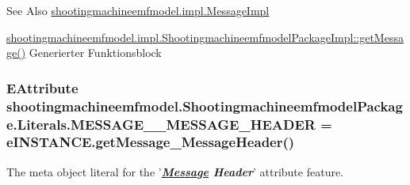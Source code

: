 \begin{DoxySeeAlso}{See Also}
\hyperlink{classshootingmachineemfmodel_1_1impl_1_1_message_impl}{shootingmachineemfmodel.\-impl.\-Message\-Impl} 

\hyperlink{classshootingmachineemfmodel_1_1impl_1_1_shootingmachineemfmodel_package_impl_ac5110626e0726dd7b9161fc57637d468}{shootingmachineemfmodel.\-impl.\-Shootingmachineemfmodel\-Package\-Impl\-::get\-Message()} Generierter Funktionsblock 
\end{DoxySeeAlso}
\hypertarget{interfaceshootingmachineemfmodel_1_1_shootingmachineemfmodel_package_1_1_literals_ac9c85c0837360031ccab61c9f987e8c9}{
\subsubsection[{M\-E\-S\-S\-A\-G\-E\-\_\-\-\_\-\-M\-E\-S\-S\-A\-G\-E\-\_\-\-H\-E\-A\-D\-E\-R}]{\setlength{\rightskip}{0pt plus 5cm}E\-Attribute shootingmachineemfmodel.\-Shootingmachineemfmodel\-Package.\-Literals.\-M\-E\-S\-S\-A\-G\-E\-\_\-\-\_\-\-M\-E\-S\-S\-A\-G\-E\-\_\-\-H\-E\-A\-D\-E\-R = e\-I\-N\-S\-T\-A\-N\-C\-E.\-get\-Message\-\_\-\-Message\-Header()}}\label{interfaceshootingmachineemfmodel_1_1_shootingmachineemfmodel_package_1_1_literals_ac9c85c0837360031ccab61c9f987e8c9}
The meta object literal for the '{\itshape {\bfseries \hyperlink{interfaceshootingmachineemfmodel_1_1_message}{Message} Header}}' attribute feature.

